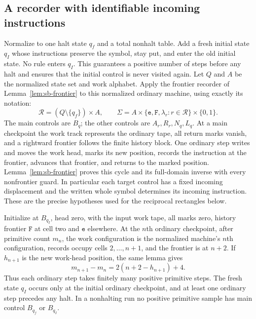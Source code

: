 \subsection{A recorder with identifiable incoming instructions}
\label{subsec:sa-autonomous-processor}
Normalize to one halt state $q_f$ and a total nonhalt table.  Add a fresh
initial state $q_I$ whose instructions preserve the symbol, stay put,
and enter the old initial state.  No rule enters $q_I$.  This guarantees
a positive number of steps before any halt and ensures that the initial
control is never visited again.  Let $Q$ and $A$ be the normalized
state set and work alphabet.
Apply the frontier recorder of Lemma~\ref{lem:sb-frontier} to this
normalized ordinary machine, using exactly its notation:
\[
 \mathcal R=(Q\setminus\{q_f\})\times A,\qquad
 \Sigma=A\times\{\mathtt e,\mathtt F,\lambda_r:r\in\mathcal R\}
                  \times\{0,1\}.
\]
The main controls are $B_q$; the other controls are $A_r,R_r,N_q,L_q$.
At a main checkpoint the work track represents the ordinary tape, all
return marks vanish, and a rightward frontier follows the finite history
block. One ordinary step writes and moves the work head, marks its new
position, records the instruction at the frontier, advances that frontier,
and returns to the marked position. Lemma~\ref{lem:sb-frontier} proves
this cycle and its full-domain inverse with every nonfrontier guard.
In particular each target control has a fixed incoming displacement and
the written whole symbol determines its incoming instruction. These are
the precise hypotheses used for the reciprocal rectangles below.

Initialize at $B_{q_I}$, head zero, with the input work tape, all marks
zero, history frontier $\mathtt F$ at cell two and $\mathtt e$ elsewhere.
At the $n$th ordinary checkpoint, after primitive count $m_n$, the work
configuration is the normalized machine's $n$th configuration, records
occupy cells $2,\ldots,n+1$, and the frontier is at $n+2$.
If $h_{n+1}$ is the new work-head position, the same lemma gives
\begin{equation}\label{eq:sa-autonomous-count}
       m_{n+1}-m_n=2(n+2-h_{n+1})+4.
\end{equation}
Thus each ordinary step takes finitely many positive primitive steps.
The fresh state $q_I$ occurs only at the initial ordinary checkpoint,
and at least one ordinary step precedes any halt. In a nonhalting run
no positive primitive sample has main control $B_{q_f}$ or $B_{q_I}$.

